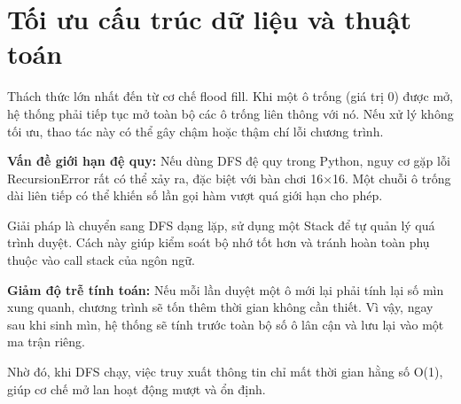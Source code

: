 \section{Tối ưu cấu trúc dữ liệu và thuật toán}

Thách thức lớn nhất đến từ cơ chế flood fill. Khi một ô trống (giá trị 0) được mở, hệ thống phải tiếp tục mở toàn bộ các ô trống liên thông với nó. Nếu xử lý không tối ưu, thao tác này có thể gây chậm hoặc thậm chí lỗi chương trình.

\textbf{Vấn đề giới hạn đệ quy:}
Nếu dùng DFS đệ quy trong Python, nguy cơ gặp lỗi RecursionError rất có thể xảy ra, đặc biệt với bàn chơi 16×16. Một chuỗi ô trống dài liên tiếp có thể khiến số lần gọi hàm vượt quá giới hạn cho phép.

Giải pháp là chuyển sang DFS dạng lặp, sử dụng một Stack để tự quản lý quá trình duyệt. Cách này giúp kiểm soát bộ nhớ tốt hơn và tránh hoàn toàn phụ thuộc vào call stack của ngôn ngữ.

\textbf{Giảm độ trễ tính toán:}
Nếu mỗi lần duyệt một ô mới lại phải tính lại số mìn xung quanh, chương trình sẽ tốn thêm thời gian không cần thiết. Vì vậy, ngay sau khi sinh mìn, hệ thống sẽ tính trước toàn bộ số ô lân cận và lưu lại vào một ma trận riêng.

Nhờ đó, khi DFS chạy, việc truy xuất thông tin chỉ mất thời gian hằng số O(1), giúp cơ chế mở lan hoạt động mượt và ổn định.